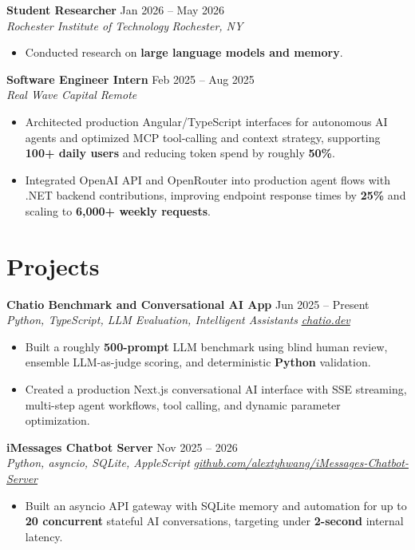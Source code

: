 \documentclass[10pt,letterpaper]{article}
\newif\ifresumeFirstRole
\newcommand{\resumeRole}[4]{%
  \ifresumeFirstRole
    \global\resumeFirstRolefalse
  \else
    \vspace{0pt plus 1fill}%
  \fi
  \textbf{#1} \hfill #2\\
  \textit{#3} \hfill \textit{#4}
}
\begin{document}
\resumeRole{Student Researcher}{Jan 2026 -- May 2026}{Rochester Institute of Technology}{Rochester, NY}
\begin{itemize}
  \item Conducted research on \textbf{large language models and memory}.
\end{itemize}

\resumeRole{Software Engineer Intern}{Feb 2025 -- Aug 2025}{Real Wave Capital}{Remote}
\begin{itemize}
  \item Architected production Angular/TypeScript interfaces for autonomous AI agents and optimized MCP tool-calling and context strategy, supporting \textbf{100+ daily users} and reducing token spend by roughly \textbf{50\%}.
  \item Integrated OpenAI API and OpenRouter into production agent flows with .NET backend contributions, improving endpoint response times by \textbf{25\%} and scaling to \textbf{6,000+ weekly requests}.
\end{itemize}

\section*{Projects}
\resumeRole{Chatio Benchmark and Conversational AI App}{Jun 2025 -- Present}{Python, TypeScript, LLM Evaluation, Intelligent Assistants}{\href{https://chatio.dev}{chatio.dev}}
\begin{itemize}
  \item Built a roughly \textbf{500-prompt} LLM benchmark using blind human review, ensemble LLM-as-judge scoring, and deterministic \textbf{Python} validation.
  \item Created a production Next.js conversational AI interface with SSE streaming, multi-step agent workflows, tool calling, and dynamic parameter optimization.
\end{itemize}

\resumeRole{iMessages Chatbot Server}{Nov 2025 -- 2026}{Python, asyncio, SQLite, AppleScript}{\href{https://github.com/alextyhwang/iMessages-Chatbot-Server}{github.com/alextyhwang/iMessages-Chatbot-Server}}
\begin{itemize}
  \item Built an asyncio API gateway with SQLite memory and automation for up to \textbf{20 concurrent} stateful AI conversations, targeting under \textbf{2-second} internal latency.
\end{itemize}
\end{document}
